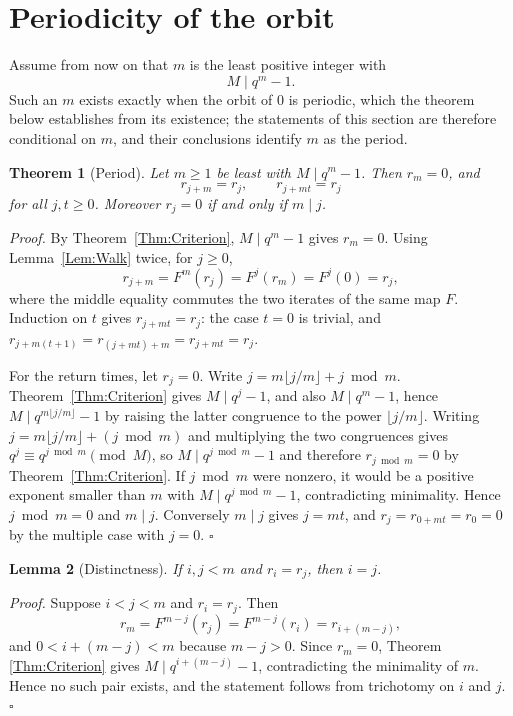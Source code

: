 \documentclass[11pt,letterpaper]{article}
\newtheorem{theorem}{Theorem}
\newtheorem{lemma}[theorem]{Lemma}
\newenvironment{proof}{\noindent\textit{Proof.}}{\hfill\(\square\)}
\begin{document}
\section{Periodicity of the orbit}

Assume from now on that \(m\) is the least positive integer with
\[
M\mid q^{m}-1 .
\]
Such an \(m\) exists exactly when the orbit of \(0\) is periodic, which the
theorem below establishes from its existence; the statements of this section
are therefore conditional on \(m\), and their conclusions identify \(m\) as
the period.

\begin{theorem}[Period]\label{Thm:Period}
Let \(m\ge1\) be least with \(M\mid q^m-1\). Then \(r_m=0\), and
\[
r_{j+m}=r_j,\qquad r_{j+mt}=r_j
\]
for all \(j,t\ge0\). Moreover \(r_j=0\) if and only if \(m\mid j\).
\end{theorem}

\begin{proof}
By Theorem~\ref{Thm:Criterion}, \(M\mid q^{m}-1\) gives \(r_m=0\). Using
Lemma~\ref{Lem:Walk} twice, for \(j\ge0\),
\[
r_{j+m}=F^{m}(r_j)=F^{j}(r_m)=F^{j}(0)=r_j,
\]
where the middle equality commutes the two iterates of the same map \(F\).
Induction on \(t\) gives \(r_{j+mt}=r_j\): the case \(t=0\) is trivial, and
\(r_{j+m(t+1)}=r_{(j+mt)+m}=r_{j+mt}=r_j\).

For the return times, let \(r_j=0\). Write \(j=m\lfloor j/m\rfloor+j\bmod m\).
Theorem~\ref{Thm:Criterion} gives \(M\mid q^{j}-1\), and also
\(M\mid q^{m}-1\), hence \(M\mid q^{m\lfloor j/m\rfloor}-1\) by raising the
latter congruence to the power \(\lfloor j/m\rfloor\). Writing
\(j=m\lfloor j/m\rfloor+(j\bmod m)\) and multiplying the two congruences
gives \(q^{j}\equiv q^{j\bmod m}\pmod M\), so \(M\mid q^{j\bmod m}-1\) and
therefore \(r_{j\bmod m}=0\) by Theorem~\ref{Thm:Criterion}. If
\(j\bmod m\) were nonzero, it would be a positive exponent smaller than
\(m\) with \(M\mid q^{j\bmod m}-1\), contradicting minimality. Hence
\(j\bmod m=0\) and \(m\mid j\). Conversely \(m\mid j\) gives \(j=mt\), and
\(r_j=r_{0+mt}=r_0=0\) by the multiple case with \(j=0\).
\end{proof}

\begin{lemma}[Distinctness]\label{Lem:Distinct}
If \(i,j<m\) and \(r_i=r_j\), then \(i=j\).
\end{lemma}

\begin{proof}
Suppose \(i<j<m\) and \(r_i=r_j\). Then
\[
r_m=F^{m-j}(r_j)=F^{m-j}(r_i)=r_{i+(m-j)},
\]
and \(0<i+(m-j)<m\) because \(m-j>0\). Since \(r_m=0\), Theorem
\ref{Thm:Criterion} gives \(M\mid q^{i+(m-j)}-1\), contradicting the
minimality of \(m\). Hence no such pair exists, and the statement follows
from trichotomy on \(i\) and \(j\).
\end{proof}
\end{document}
